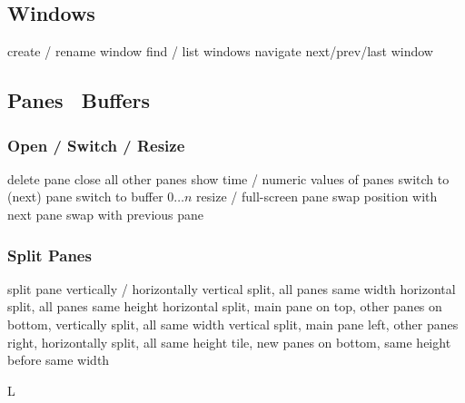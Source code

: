 \subsection{Windows}{}
	{create / rename window}
	{find / list windows}
	{navigate next/prev/last window}

\subsection{Panes \or\ Buffers}{}
\subsubsection{Open / Switch / Resize}{}
	{delete pane}
	{close all other panes}
	{show time / numeric values of panes}
	{switch to (next) pane}
	{switch to buffer $0 \ldots n$}
	{resize / full-screen pane}
	{swap position with next pane}
	{swap with previous pane}

\subsubsection{Split Panes}{}
	{split pane vertically / horizontally}
	{vertical split, all panes same width}
	{horizontal split, all panes same height}
	{horizontal split, main pane on top, other panes on bottom, vertically split, all same width}
	{vertical split, main pane left, other panes right, horizontally split, all same height}
	{tile, new panes on bottom, same height before same width}

\copyrightnotice

\supereject
\if L\lr \else\null\vfill\eject\fi
\bye

